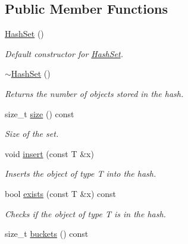 \subsection*{Public Member Functions}
\begin{DoxyCompactItemize}
\item 
\hyperlink{class_hash_set_af3813c169024060da2044aafe3851a8d}{Hash\-Set} ()
\begin{DoxyCompactList}\small\item\em Default constructor for \hyperlink{class_hash_set}{Hash\-Set}. \end{DoxyCompactList}\item 
\hypertarget{class_hash_set_a58686b84c9bb5e744e279e5d52b8c656}{\hyperlink{class_hash_set_a58686b84c9bb5e744e279e5d52b8c656}{$\sim$\-Hash\-Set} ()}\label{class_hash_set_a58686b84c9bb5e744e279e5d52b8c656}

\begin{DoxyCompactList}\small\item\em Returns the number of objects stored in the hash. \end{DoxyCompactList}\item 
\hypertarget{class_hash_set_a50921b9d5cacac394dc71a63bee037a7}{size\-\_\-t \hyperlink{class_hash_set_a50921b9d5cacac394dc71a63bee037a7}{size} () const }\label{class_hash_set_a50921b9d5cacac394dc71a63bee037a7}

\begin{DoxyCompactList}\small\item\em Size of the set. \end{DoxyCompactList}\item 
void \hyperlink{class_hash_set_a0134587851696ec3f2cb41c34f7f70b5}{insert} (const T \&x)
\begin{DoxyCompactList}\small\item\em Inserts the object of type T into the hash. \end{DoxyCompactList}\item 
bool \hyperlink{class_hash_set_a791fc527424c724a415ebd88b38a42ba}{exists} (const T \&x) const 
\begin{DoxyCompactList}\small\item\em Checks if the object of type T is in the hash. \end{DoxyCompactList}\item 
\hypertarget{class_hash_set_a549b200c4b34ef30b8dafbbae6cad008}{size\-\_\-t \hyperlink{class_hash_set_a549b200c4b34ef30b8dafbbae6cad008}{buckets} () const }\label{class_hash_set_a549b200c4b34ef30b8dafbbae6cad008}


\end{DoxyCompactItemize}
